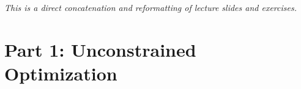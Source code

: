 

\renewcommand{\course}{Introduction to Optimization}
\renewcommand{\coursepicture}{optim}
\renewcommand{\coursedate}{Winter 2024/25}

\script

\usepackage{etoolbox}

\newlength\rightmargintoc
\setlength\rightmargintoc{\linewidth}
\addtolength\rightmargintoc{-7em}

\makeatletter
\def\subsubsectocline#1#2#3#4#5{%
\parshape 2 4em \rightmargintoc \dimexpr\parindent+4em\relax \rightmargintoc
\@tempdima#3
\ifdim\lastskip=1sp;\hskip1ex\relax\ \else\fi{\footnotesize#4}\hskip1sp%
}
\renewcommand*\l@subsubsection{\subsubsectocline{1}{0em}{2em}}
\makeatother


  
\scripttitle

\emph{This is a direct concatenation and reformatting of lecture
    slides and exercises.}

\tableofcontents


\clearpage
\slidefont
\fancyhfoffset{0mm}


\clearpage
\section{Part 1: Unconstrained Optimization}





